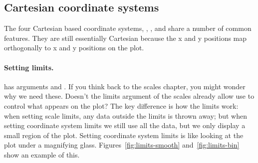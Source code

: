 \subsection{Cartesian coordinate systems}
\label{sub:cartesian}

The four Cartesian based coordinate systems, , ,  and  share a number of common features.  They are still essentially Cartesian because the x and y positions map orthogonally to x and y positions on the plot.  

\paragraph{Setting limits.}   has arguments  and .  If you think back to the scales chapter, you might wonder why we need these.  Doesn't the limits argument of the scales already allow use to control what appears on the plot?  The key difference is how the limits work: when setting scale limits, any data outside the limits is thrown away; but when setting coordinate system limits we still use all the data, but we only display a small region of the plot.  Setting coordinate system limits is like looking at the plot under a magnifying glass.  Figures~\ref{fig:limits-smooth} and~\ref{fig:limits-bin} show an example of this.

% 


% 


